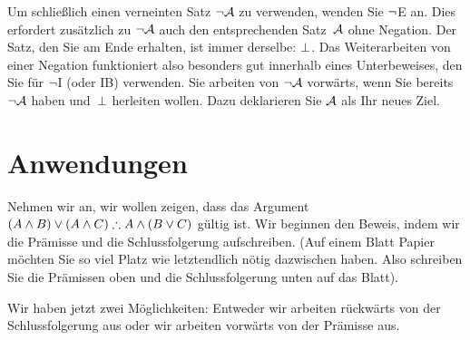 Um schlie{\ss}lich einen verneinten Satz $\neg \mathcal{A}$ zu verwenden, wenden Sie $\neg$E an. Dies erfordert zusätzlich zu $\neg \mathcal{A}$ auch den entsprechenden Satz~$\mathcal{A}$ ohne Negation. Der Satz, den Sie am Ende erhalten, ist immer derselbe: $\bot$. Das Weiterarbeiten von einer Negation funktioniert also besonders gut innerhalb eines Unterbeweises, den Sie für $\neg$I (oder IB) verwenden. Sie arbeiten von $\neg \mathcal{A}$ vorwärts, wenn Sie bereits $\neg \mathcal{A}$ haben und~$\bot$ herleiten wollen. Dazu deklarieren Sie $\mathcal{A}$ als Ihr neues Ziel.
\begin{fitchproof}
	\ellipsesline 
\end{fitchproof}

\section{Anwendungen}

Nehmen wir an, wir wollen zeigen, dass das Argument $(A \eand B) \eor (A \eand C) \therefore A \eand (B \eor C)$ gültig ist. Wir beginnen den Beweis, indem wir die Prämisse und die Schlussfolgerung aufschreiben. (Auf einem Blatt Papier möchten Sie so viel Platz wie letztendlich nötig dazwischen haben. Also schreiben Sie die Prämissen oben und die Schlussfolgerung unten auf das Blatt).
\begin{fitchproof}
\ellipsesline
\end{fitchproof}
Wir haben jetzt zwei Möglichkeiten: Entweder wir arbeiten rückwärts von der Schlussfolgerung aus oder wir arbeiten vorwärts von der Prämisse aus. 


